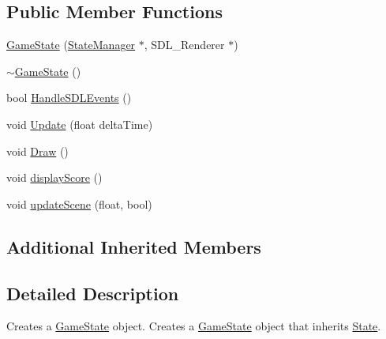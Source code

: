 \subsection*{Public Member Functions}
\begin{DoxyCompactItemize}
\item 
\hyperlink{class_game_state_a0e812c09d724c03147ad6721b4d7bd73}{Game\+State} (\hyperlink{class_state_manager}{State\+Manager} $\ast$, S\+D\+L\+\_\+\+Renderer $\ast$)
\item 
\hyperlink{class_game_state_ae623df5042cd0c17daa3394fdcb397b3}{$\sim$\+Game\+State} ()
\item 
bool \hyperlink{class_game_state_a5e2467775e9a941d482e0489295c363d}{Handle\+S\+D\+L\+Events} ()
\item 
void \hyperlink{class_game_state_a2ea32b0cd5f747ef6223d182f415a6c4}{Update} (float delta\+Time)
\item 
void \hyperlink{class_game_state_ab9330b36c7c74d733c2739c025285c64}{Draw} ()
\item 
void \hyperlink{class_game_state_af45ac6c893265a41b011bba850dc840a}{display\+Score} ()
\item 
void \hyperlink{class_game_state_ab22e8c062ae3d629044b93faba688974}{update\+Scene} (float, bool)
\end{DoxyCompactItemize}
\subsection*{Additional Inherited Members}


\subsection{Detailed Description}
Creates a \hyperlink{class_game_state}{Game\+State} object. Creates a \hyperlink{class_game_state}{Game\+State} object that inherits \hyperlink{class_state}{State}. 

